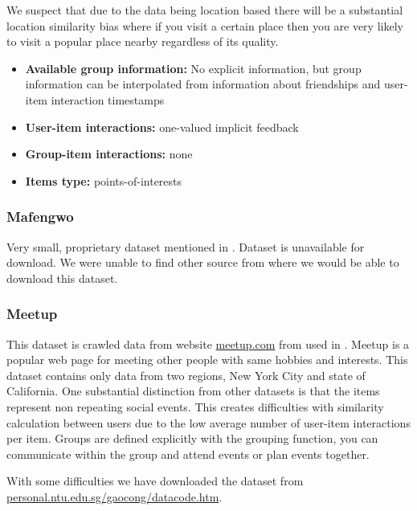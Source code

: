 We suspect that due to the data being location based there will be a substantial location similarity bias where if you visit a certain place then you are very likely to visit a popular place nearby regardless of its quality.

\begin{itemize}
    \item \textbf{Available group information:} No explicit information, but group information can be interpolated from information about friendships and user-item interaction timestamps
    \item \textbf{User-item interactions:} one-valued implicit feedback
    \item \textbf{Group-item interactions:} none
    \item \textbf{Items type:} points-of-interests
\end{itemize}


\subsubsection{Mafengwo} \label{subsubsec:04_group_datasets.overview.mafengwo}
Very small, proprietary dataset mentioned in \cite{attentative_group_recommendation}. Dataset is unavailable for download. We were unable to find other source from where we would be able to download this dataset.


\subsubsection{Meetup} \label{subsubsec:04_group_datasets.overview.meetup}
This dataset is crawled data from website \href{https://www.meetup.com}{meetup.com} from \cite{meetup_origin} used in \cite{meetup_plancast}. Meetup is a popular web page for meeting other people with same hobbies and interests. This dataset contains only data from two regions, New York City and state of California. One substantial distinction from other datasets is that the items represent non repeating social events. This creates difficulties with similarity calculation between users due to the low average number of user-item interactions per item. Groups are defined explicitly with the grouping function, you can communicate within the group and attend events or plan events together.

With some difficulties we have downloaded the dataset from
\newline\href{https://personal.ntu.edu.sg/gaocong/datacode.htm}{personal.ntu.edu.sg/gaocong/datacode.htm}.

